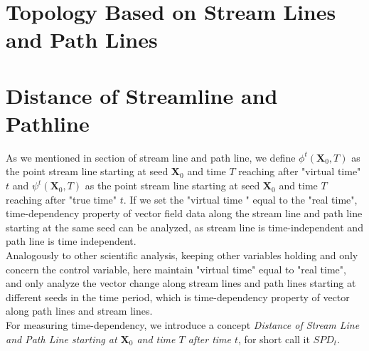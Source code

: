 \documentclass[
     11pt,         %
     a4paper,      %
     oneside,
     ]{article}
\newcommand{\vect}[1]{\boldsymbol{#1}}
\begin{document}
    \section{Topology Based on Stream Lines and Path Lines}
    \label{sec:Topology}
	\section{Distance of Streamline and Pathline}
	\label{sec:Distance}
    As we mentioned in section of stream line and path line, we define $\phi^{t}(\vect{X}_{0},T)$ as the point stream line starting at seed $\vect{X}_{0}$ and time $T$ reaching after "virtual time" $t$ and $\psi^{t}(\vect{X}_{0},T)$ as the point stream line starting at seed $\vect{X}_{0}$ and time $T$ reaching after "true time" $t$. If we set the "virtual time " equal to the "real time", time-dependency property of vector field data along the stream line and path line starting at the same seed can be analyzed, as stream line is time-independent and path line is time independent.\\
    Analogously to  other scientific analysis, keeping other variables holding and only concern the control variable, here maintain "virtual time" equal to "real time", and only analyze the vector change along stream lines and path lines starting at different seeds in the time period, which is time-dependency property of vector along path lines and stream lines.\\
    For measuring time-dependency, we introduce a concept \textit{Distance of Stream Line and Path Line starting at $\vect{X}_{0}$ and time $T$ after time $t$}, for short call it $SPD_{t}$.\\
\end{document}
